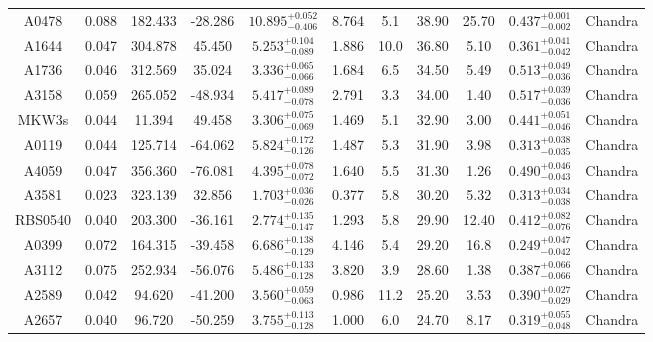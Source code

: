 \documentclass{aa}   %
\begin{document}
\begin{table}[ht!]
\begin{center}
\begin{tabular}{ c  c  c  c c c c c c c c }
A0478               		&		0.088	&	182.433	&	-28.286	& $ 10.895^{+0.052}_{-0.406}$ &      8.764	&  5.1	&	38.90	&  25.70	&	$ 0.437^{+0.001}_{-0.002}  $ &	 Chandra      \\
A1644               		&		0.047	&	304.878	&	45.450	& $	5.253^{+0.104}_{-0.089}$  &      1.886	&  10.0	&	36.80	&	5.10	&	$ 0.361^{+0.041}_{-0.042}  $ &	 Chandra      \\
A1736               		&		0.046	&	312.569	&	35.024	& $	3.336^{+0.065}_{-0.066}$  &      1.684	&  6.5	&	34.50	&	5.49	&	$ 0.513^{+0.049}_{-0.036}  $ &	 Chandra      \\
A3158               		&		0.059	&	265.052	&	-48.934	& $	5.417^{+0.089}_{-0.078}$  &      2.791	&  3.3	&	34.00	&	1.40	&	$ 0.517^{+0.039}_{-0.036}  $ &	  Chandra     \\
MKW3s               		&		0.044	&	11.394	&	49.458	& $	3.306^{+0.075}_{-0.069}$  &      1.469	&  5.1	&	32.90	&	3.00	&	$ 0.441^{+0.051}_{-0.046}  $ &	  Chandra     \\
A0119               		&		0.044	&	125.714	&	-64.062	& $	5.824^{+0.172}_{-0.126}$  &      1.487	&  5.3	&	31.90	&	3.98	&	$ 0.313^{+0.038}_{-0.035}  $ &	  Chandra     \\
A4059               		&		0.047	&	356.360	&	-76.081	& $	4.395^{+0.078}_{-0.072}$  &      1.640	&  5.5	&	31.30	&	1.26	&	$ 0.490^{+0.046}_{-0.043}  $ &	  Chandra     \\
A3581               		&		0.023	&	323.139	&	32.856	& $	1.703^{+0.036}_{-0.026}$  &      0.377	&  5.8	&	30.20	&	5.32	&	$ 0.313^{+0.034}_{-0.038}  $ &	 Chandra      \\
RBS0540             		&		0.040	&	203.300	&	-36.161	& $	2.774^{+0.135}_{-0.147}$  &      1.293	&  5.8	&	29.90	&  12.40	&	$ 0.412^{+0.082}_{-0.076}  $ &	 Chandra      \\
A0399               		&		0.072	&	164.315	&	-39.458	& $	6.686^{+0.138}_{-0.129}$  &      4.146	&  5.4	&	29.20	&	16.8	&	$ 0.249^{+0.047}_{-0.042}  $ &	 Chandra      \\
A3112               		&		0.075	&	252.934	&	-56.076	& $	5.486^{+0.133}_{-0.128}$  &      3.820	&  3.9	&	28.60	&	1.38	&	$ 0.387^{+0.066}_{-0.066}  $ &	  Chandra     \\
A2589               		&		0.042	&	94.620	&	-41.200	& $	3.560^{+0.059}_{-0.063}$  &      0.986	&  11.2	&	25.20	&	3.53	&	$ 0.390^{+0.027}_{-0.029}  $ &	  Chandra     \\
A2657               		&		0.040	&	96.720	&	-50.259	& $	3.755^{+0.113}_{-0.128}$  &      1.000	&  6.0	&	24.70	&	8.17	&	$ 0.319^{+0.055}_{-0.048}  $ &	 Chandra      \\

\end{tabular}
\end{center}
\end{table}
\end{document}
